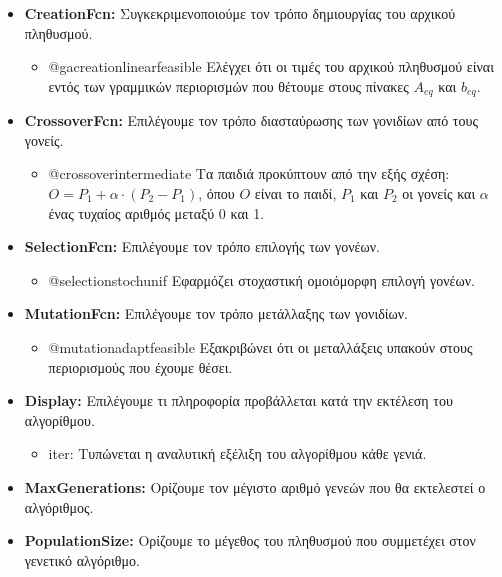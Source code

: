 \documentclass[twocolumn]{report}
\begin{document}
\begin{itemize}
    \item {}\textbf{CreationFcn:} 
    Συγκεκριμενοποιούμε τον τρόπο δημιουργίας του αρχικού πληθυσμού. 
    \begin{itemize}    
        \item {}@gacreationlinearfeasible
        Ελέγχει ότι οι τιμές του αρχικού πληθυσμού είναι εντός των γραμμικών περιορισμών
        που θέτουμε στους πίνακες $A_{eq}$ και $b_{eq}$.
    \end{itemize}

    \item {}\textbf{CrossoverFcn:} 
    Επιλέγουμε τον τρόπο διασταύρωσης των γονιδίων από τους γονείς.
    \begin{itemize}
        \item {}@crossoverintermediate
        Τα παιδιά προκύπτουν από την εξής σχέση: $ O = P_1 + \alpha \cdot (P_2 - P_1) $,
        όπου $O$ είναι το παιδί, $P_1$ και $P_2$ οι γονείς και $\alpha$ ένας τυχαίος αριθμός
        μεταξύ 0 και 1.
    \end{itemize}

    \item {}\textbf{SelectionFcn:} 
    Επιλέγουμε τον τρόπο επιλογής των γονέων.
    \begin{itemize}
        \item {}@selectionstochunif
        Εφαρμόζει στοχαστική ομοιόμορφη επιλογή γονέων.
    \end{itemize}

    \item {}\textbf{MutationFcn:}
    Επιλέγουμε τον τρόπο μετάλλαξης των γονιδίων.
    \begin{itemize}
        \item {}@mutationadaptfeasible
        Εξακριβώνει ότι οι μεταλλάξεις υπακούν στους περιορισμούς που έχουμε θέσει.
    \end{itemize}

    \item {}\textbf{Display:}
    Επιλέγουμε τι πληροφορία προβάλλεται κατά την εκτέλεση του αλγορίθμου.
    \begin{itemize}
        \item {}iter:
        Τυπώνεται η αναλυτική εξέλιξη του αλγορίθμου κάθε γενιά.
    \end{itemize}

    \item {}\textbf{MaxGenerations:}
    Ορίζουμε τον μέγιστο αριθμό γενεών που θα εκτελεστεί ο αλγόριθμος.

    \item {}\textbf{PopulationSize:}
    Ορίζουμε το μέγεθος του πληθυσμού που συμμετέχει στον γενετικό αλγόριθμο.
\end{itemize}
\end{document}
